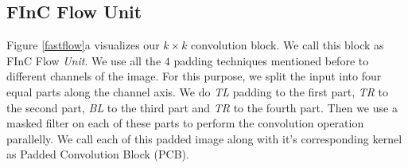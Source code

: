 \documentclass[a4paper,twoside]{article}
\theoremstyle{definition}
\begin{document}
\subsection{FInC Flow Unit}\label{section:fastflowunit}

Figure \ref{fastflow}a visualizes our $k \times k$ convolution block. We call this block as FInC Flow \emph{Unit}. We use all the $4$ padding techniques mentioned before to different channels of the image. For this purpose, we split the input into four equal parts along the channel axis. We do \emph{TL} padding to the first part, \emph{TR} to the second part, \emph{BL} to the third part and \emph{TR} to the fourth part. Then we use a masked filter on each of these parts to perform the convolution operation parallelly. We call each of this padded image along with it's corresponding kernel as Padded Convolution Block (PCB).
\end{document}
